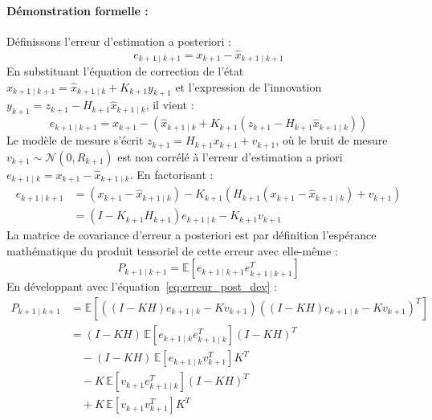 \documentclass[../Formulations_Kalman.tex]{subfiles}
\begin{document}
\paragraph{Démonstration formelle :}
Définissons l'erreur d'estimation a posteriori :
\begin{equation}
e_{k+1\mid k+1} = x_{k+1} - \hat{x}_{k+1\mid k+1}
\end{equation}
En substituant l'équation de correction de l'état $\hat{x}_{k+1\mid k+1} = \hat{x}_{k+1\mid k} + K_{k+1} y_{k+1}$ et l'expression de l'innovation $y_{k+1} = z_{k+1} - H_{k+1}\hat{x}_{k+1\mid k}$, il vient :
\begin{equation}
e_{k+1\mid k+1} = x_{k+1} - \left( \hat{x}_{k+1\mid k} + K_{k+1} (z_{k+1} - H_{k+1} \hat{x}_{k+1\mid k}) \right)
\end{equation}
Le modèle de mesure s'écrit $z_{k+1} = H_{k+1} x_{k+1} + v_{k+1}$, où le bruit de mesure $v_{k+1} \sim \mathcal{N}(0, R_{k+1})$ est non corrélé à l'erreur d'estimation a priori $e_{k+1\mid k} = x_{k+1} - \hat{x}_{k+1\mid k}$. En factorisant :
\begin{align}
e_{k+1\mid k+1} &= (x_{k+1} - \hat{x}_{k+1\mid k}) - K_{k+1} \left( H_{k+1} (x_{k+1} - \hat{x}_{k+1\mid k}) + v_{k+1} \right) \nonumber \\
&= (I - K_{k+1} H_{k+1}) e_{k+1\mid k} - K_{k+1} v_{k+1}
\label{eq:erreur_post_dev}
\end{align}
La matrice de covariance d'erreur a posteriori est par définition l'espérance mathématique du produit tensoriel de cette erreur avec elle-même :
\begin{equation}
P_{k+1\mid k+1} = \mathbb{E}\left[ e_{k+1\mid k+1} e_{k+1\mid k+1}^T \right]
\end{equation}
En développant avec l'équation~\eqref{eq:erreur_post_dev} :
\begin{align}
P_{k+1\mid k+1} &= \mathbb{E}\left[ \left( (I - KH) e_{k+1\mid k} - K v_{k+1} \right) \left( (I - KH) e_{k+1\mid k} - K v_{k+1} \right)^T \right] \nonumber \\
&= (I - KH) \, \mathbb{E}\left[ e_{k+1\mid k} e_{k+1\mid k}^T \right] (I - KH)^T \nonumber \\
&\quad - (I - KH) \, \mathbb{E}\left[ e_{k+1\mid k} v_{k+1}^T \right] K^T \nonumber \\
&\quad - K \, \mathbb{E}\left[ v_{k+1} e_{k+1\mid k}^T \right] (I - KH)^T \nonumber \\
&\quad + K \, \mathbb{E}\left[ v_{k+1} v_{k+1}^T \right] K^T
\end{align}
\end{document}

